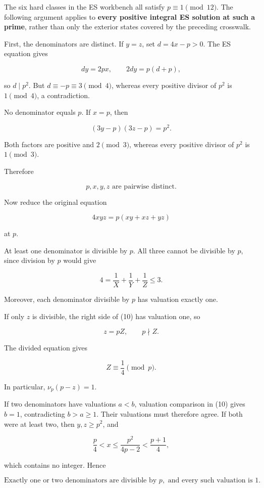 The six hard classes in the ES workbench all satisfy
\(p\equiv1\pmod{12}\). The following argument applies to \textbf{every
positive integral ES solution at such a prime}, rather than only the
exterior states covered by the preceding crosswalk.

First, the denominators are distinct. If \(y=z\), set \(d=4x-p>0\). The
ES equation gives

\[
dy=2px,\qquad 2dy=p(d+p),
\]

so \(d\mid p^2\). But \(d\equiv-p\equiv3\pmod4\), whereas every positive
divisor of \(p^2\) is \(1\pmod4\), a contradiction.

No denominator equals \(p\). If \(x=p\), then

\[
(3y-p)(3z-p)=p^2.
\]

Both factors are positive and \(2\pmod3\), whereas every positive
divisor of \(p^2\) is \(1\pmod3\).

Therefore

\[
\boxed{p,x,y,z\text{ are pairwise distinct}.}
\tag{9}
\]

Now reduce the original equation

\[
4xyz=p(xy+xz+yz)
\tag{10}
\]

at \(p\).

At least one denominator is divisible by \(p\). All three cannot be
divisible by \(p\), since division by \(p\) would give

\[
4=\frac1X+\frac1Y+\frac1Z\le3.
\]

Moreover, each denominator divisible by \(p\) has valuation exactly one.

If only \(z\) is divisible, the right side of (10) has valuation one, so

\[
z=pZ,\qquad p\nmid Z.
\]

The divided equation gives

\[
\boxed{Z\equiv\frac14\pmod p.}
\tag{11}
\]

In particular, \(\nu_p(p-z)=1\).

If two denominators have valuations \(a<b\), valuation comparison in
(10) gives \(b=1\), contradicting \(b>a\ge1\). Their valuations must
therefore agree. If both were at least two, then \(y,z\ge p^2\), and

\[
\frac p4<x\le\frac{p^2}{4p-2}<\frac{p+1}{4},
\]

which contains no integer. Hence

\[
\boxed{
\text{Exactly one or two denominators are divisible by }p,
\text{ and every such valuation is }1.
}
\tag{12}
\]

